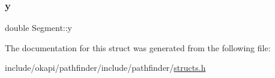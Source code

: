 \mbox{\label{structSegment_aba4eb12927d2167032feed9e783196b4}} 
\subsubsection{\texorpdfstring{y}{y}}
{\footnotesize\ttfamily double Segment\+::y}



The documentation for this struct was generated from the following file\+:\begin{DoxyCompactItemize}
\item 
include/okapi/pathfinder/include/pathfinder/\mbox{\hyperlink{structs_8h}{structs.\+h}}\end{DoxyCompactItemize}
